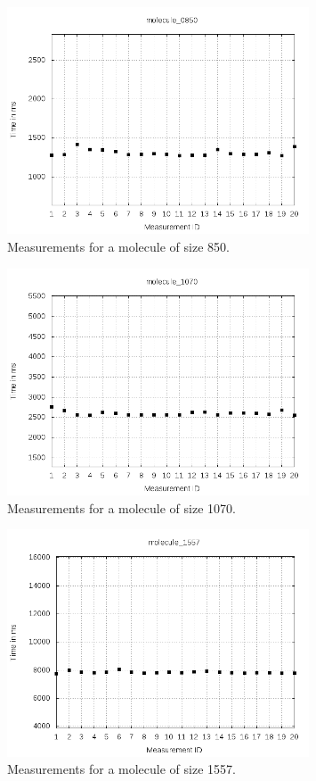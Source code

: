 \documentclass[a4paper,12pt]{article}
\begin{document}
\begin{figure}[!h]
  \centering
    \includegraphics[width=0.8\textwidth]{images/solver-perf-molecule_0850.png}
  \caption{Measurements for a molecule of size 850.}
\end{figure}

\begin{figure}[!h]
  \centering
    \includegraphics[width=0.8\textwidth]{images/solver-perf-molecule_1070.png}
  \caption{Measurements for a molecule of size 1070.}
\end{figure}

\begin{figure}[!h]
  \centering
    \includegraphics[width=0.8\textwidth]{images/solver-perf-molecule_1557.png}
  \caption{Measurements for a molecule of size 1557.}
\end{figure}
\end{document}
